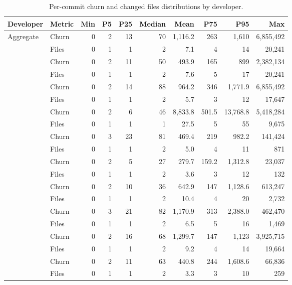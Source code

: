 \documentclass[smallextended]{svjour3}
\begin{document}
\begin{table}[tbp]
  \caption{Per-commit churn and changed files distributions by developer.}
    \label{tab:rq4-churn-scattering}
  \centering
  \scriptsize
  \setlength{\tabcolsep}{3.2pt}
  \begin{tabular}{llrrrrrrrr}
    \toprule
    Developer & Metric & Min & P5 & P25 & Median & Mean & P75 & P95 & Max \\
    \midrule
    \multirow{2}{*}{Aggregate} & Churn & 0 & 2 & 13 & 70 & 1,116.2 & 263 & 1,610 & 6,855,492 \\
    & Files & 0 & 1 & 1 & 2 & 7.1 & 4 & 14 & 20,241 \\
    \addlinespace
    \multirow{2}{*}{steipete} & Churn & 0 & 2 & 11 & 50 & 493.9 & 165 & 899 & 2,382,134 \\
    & Files & 0 & 1 & 1 & 2 & 7.6 & 5 & 17 & 20,241 \\
    \addlinespace
    \multirow{2}{*}{Dicklesworthstone} & Churn & 0 & 2 & 14 & 88 & 964.2 & 346 & 1,771.9 & 6,855,492 \\
    & Files & 0 & 1 & 1 & 2 & 5.7 & 3 & 12 & 17,647 \\
    \addlinespace
    \multirow{2}{*}{ruvnet} & Churn & 0 & 2 & 6 & 46 & 8,833.8 & 501.5 & 13,768.8 & 5,418,284 \\
    & Files & 0 & 1 & 1 & 1 & 27.5 & 5 & 55 & 9,675 \\
    \addlinespace
    \multirow{2}{*}{obra} & Churn & 0 & 3 & 23 & 81 & 469.4 & 219 & 982.2 & 141,424 \\
    & Files & 0 & 1 & 1 & 2 & 5.0 & 4 & 11 & 871 \\
    \addlinespace
    \multirow{2}{*}{philipp-spiess} & Churn & 0 & 2 & 5 & 27 & 279.7 & 159.2 & 1,312.8 & 23,037 \\
    & Files & 0 & 1 & 1 & 2 & 3.6 & 3 & 12 & 132 \\
    \addlinespace
    \multirow{2}{*}{mavam} & Churn & 0 & 2 & 10 & 36 & 642.9 & 147 & 1,128.6 & 613,247 \\
    & Files & 0 & 1 & 1 & 2 & 10.4 & 4 & 20 & 2,732 \\
    \addlinespace
    \multirow{2}{*}{teamchong} & Churn & 0 & 3 & 21 & 82 & 1,170.9 & 313 & 2,388.0 & 462,470 \\
    & Files & 0 & 1 & 1 & 2 & 6.5 & 5 & 16 & 1,469 \\
    \addlinespace
    \multirow{2}{*}{clubanderson} & Churn & 0 & 2 & 16 & 68 & 1,299.7 & 147 & 1,123 & 3,925,715 \\
    & Files & 0 & 1 & 1 & 2 & 9.2 & 4 & 14 & 19,664 \\
    \addlinespace
    \multirow{2}{*}{steveyegge} & Churn & 0 & 2 & 11 & 63 & 440.8 & 244 & 1,608.6 & 66,836 \\
    & Files & 0 & 1 & 1 & 2 & 3.3 & 3 & 10 & 259 \\
    \bottomrule
  \end{tabular}
\end{table}
\end{document}
